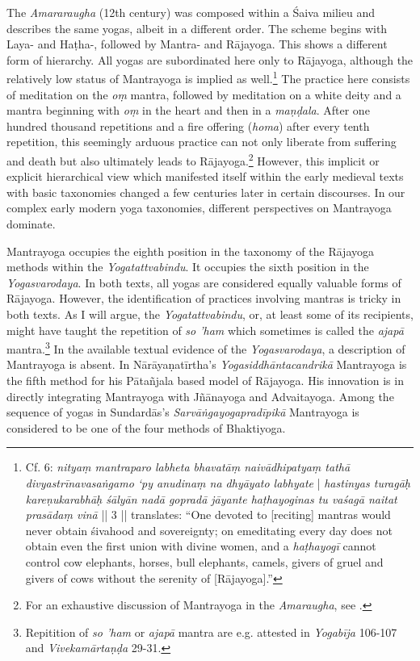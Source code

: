 The \emph{Amararaugha} (12th century) was composed within a Śaiva milieu and describes the same yogas, albeit in a different order. The scheme begins with Laya- and Haṭha-, followed by Mantra- and Rājayoga. This shows a different form of hierarchy. All yogas are subordinated here only to Rājayoga, although the relatively low status of Mantrayoga is implied as well.\footnote{Cf.  6: \textit{nityaṃ mantraparo labheta bhavatāṃ naivādhipatyaṃ tathā divyastrīnavasaṅgamo ‘py anudinaṃ na dhyāyato labhyate} | \textit{hastinyas turagāḥ kareṇukarabhāḥ śālyān nadā gopradā jāyante haṭhayoginas tu vaśagā naitat prasādaṃ vinā} || 3 || \citeauthor{amaraugha2024} translates: ``One devoted to [reciting] mantras would never obtain śivahood and sovereignty; on emeditating every day does not obtain even the first union with divine women, and a \textit{haṭhayogī} cannot control cow elephants, horses, bull elephants, camels, givers of gruel and givers of cows without the serenity of [Rājayoga].''} The practice here consists of meditation on the \textit{oṃ} mantra, followed by meditation on a white deity and a mantra beginning with \textit{oṃ} in the heart and then in a \textit{maṇḍala}. After one hundred thousand repetitions and a fire offering (\textit{homa}) after every tenth repetition, this seemingly arduous practice can not only liberate from suffering and death but also ultimately leads to Rājayoga.\footnote{For an exhaustive discussion of Mantrayoga in the \emph{Amaraugha}, see \citeauthor[2024: 34-35]{amaraugha2024}.} However, this implicit or explicit hierarchical view which manifested itself within the early medieval texts with basic taxonomies changed a few centuries later in certain discourses. In our complex early modern yoga taxonomies, different perspectives on Mantrayoga dominate.     

Mantrayoga occupies the eighth position in the taxonomy of the Rājayoga methods within the \textit{Yogatattvabindu}. It occupies the sixth position in the \textit{Yogasvarodaya}. In both texts, all yogas are considered equally valuable forms of Rājayoga. However, the identification of practices involving mantras is tricky in both texts. As I will argue, the \textit{Yogatattvabindu}, or, at least some of its recipients, might have taught the repetition of \textit{so 'ham} which sometimes is called the \textit{ajapā} mantra.\footnote{Repitition of \textit{so 'ham} or \textit{ajapā} mantra are e.g. attested in \emph{Yogabīja} 106-107 and \emph{Vivekamārtaṇḍa} 29-31.} In the available textual evidence of the \emph{Yogasvarodaya}, a description of Mantrayoga is absent. In Nārāyaṇatīrtha's \textit{Yogasiddhāntacandrikā} Mantrayoga is the fifth method for his Pātañjala based model of Rājayoga. His innovation is in directly integrating Mantrayoga with Jñānayoga and Advaitayoga. Among the sequence of yogas in Sundardās's \textit{Sarvāṅgayogapradīpikā} Mantrayoga is considered to be one of the four methods of Bhaktiyoga. 

